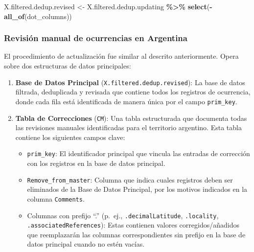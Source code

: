 \documentclass[sn-apa,pdflatex]{sn-jnl}
\newenvironment{Shaded}{\begin{snugshade}}{\end{snugshade}}
\newcommand{\FunctionTok}[1]{\textcolor[rgb]{0.13,0.29,0.53}{\textbf{#1}}}
\newcommand{\NormalTok}[1]{#1}
\newcommand{\OtherTok}[1]{\textcolor[rgb]{0.56,0.35,0.01}{#1}}
\newcommand{\SpecialCharTok}[1]{\textcolor[rgb]{0.81,0.36,0.00}{\textbf{#1}}}
\providecommand{\tightlist}{%
  \setlength{\itemsep}{0pt}\setlength{\parskip}{0pt}}
\begin{document}
\begin{Shaded}
\begin{Highlighting}[]
\NormalTok{X.filtered.dedup.revised }\OtherTok{\textless{}{-}}\NormalTok{ X.filtered.dedup.updating }\SpecialCharTok{\%\textgreater{}\%}
    \FunctionTok{select}\NormalTok{(}\SpecialCharTok{{-}}\FunctionTok{all\_of}\NormalTok{(dot\_columns))}
\end{Highlighting}
\end{Shaded}

\subsubsection{Revisión manual de ocurrencias en
Argentina}\label{revisiuxf3n-manual-de-ocurrencias-en-argentina}

El procedimiento de actualización fue similar al descrito anteriormente.
Opera sobre dos estructuras de datos principales:

\begin{enumerate}
\def\labelenumi{\arabic{enumi}.}
\item
  \textbf{Base de Datos Principal} (\texttt{X.filtered.dedup.revised}):
  La base de datos filtrada, deduplicada y revisada que contiene todos
  los registros de ocurrencia, donde cada fila está identificada de
  manera única por el campo \texttt{prim\_key}.
\item
  \textbf{Tabla de Correcciones} (\texttt{CM}): Una tabla estructurada
  que documenta todas las revisiones manuales identificadas para el
  territorio argentino. Esta tabla contiene los siguientes campos clave:

  \begin{itemize}
  \tightlist
  \item
    \texttt{prim\_key}: El identificador principal que vincula las
    entradas de corrección con los registros en la base de datos
    principal.\\
  \item
    \texttt{Remove\_from\_master}: Columna que indica cuales registros
    deben ser eliminados de la Base de Datos Principal, por los motivos
    indicados en la columna \texttt{Comments}.
  \item
    Columnas con prefijo ``.'' (p.~ej., \texttt{.decimalLatitude},
    \texttt{.locality}, \texttt{.associatedReferences}): Estas contienen
    valores corregidos/añadidos que reemplazarán las columnas
    correspondientes sin prefijo en la base de datos principal cuando no
    estén vacías.
  \end{itemize}
\end{enumerate}
\end{document}
